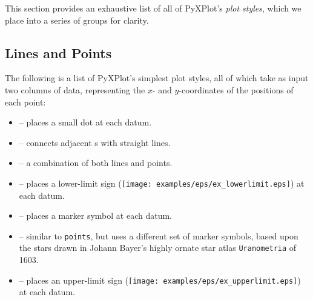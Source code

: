 This section provides an exhaustive list of all of PyXPlot's {\it plot styles},
which we place into a series of groups for clarity.

\subsection{Lines and Points}

The following is a list of PyXPlot's simplest plot styles, all of which take as
input two columns of data, representing the $x$- and $y$-coordinates of the
positions of each point:
\begin{itemize}
\item {} -- places a small dot at each datum.
\item {} -- connects adjacent \datapoint s with straight lines.
\item {} -- a combination of both lines and points.
\item {} -- places a lower-limit sign (\texttt{[image: examples/eps/ex\_lowerlimit.eps]}) at each datum.
\item {} -- places a marker symbol at each datum.
\item {} -- similar to {\tt points}, but uses a different set of marker symbols, based upon the stars drawn in Johann Bayer's highly ornate star atlas {\tt Uranometria} of 1603.
\item {} -- places an upper-limit sign (\texttt{[image: examples/eps/ex\_upperlimit.eps]}) at each datum.
\end{itemize}

